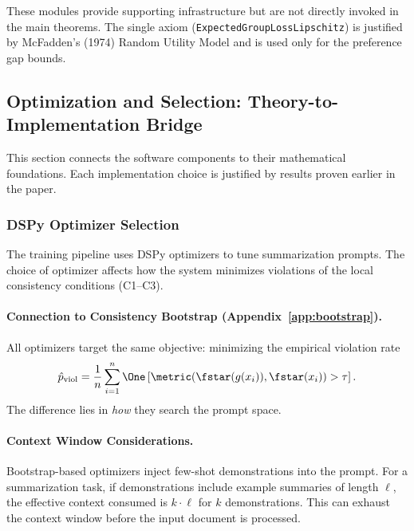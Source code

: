 These modules provide supporting infrastructure but are not directly invoked in the main theorems. The single axiom (\texttt{ExpectedGroupLossLipschitz}) is justified by McFadden's (1974) Random Utility Model and is used only for the preference gap bounds.



\subsection{Optimization and Selection: Theory-to-Implementation Bridge}\label{sec:theory-impl-bridge}

This section connects the software components to their mathematical foundations. Each implementation choice is justified by results proven earlier in the paper.

\subsubsection{DSPy Optimizer Selection}

The training pipeline uses DSPy optimizers to tune summarization prompts. The choice of optimizer affects how the system minimizes violations of the local consistency conditions (C1--C3).

\paragraph{Connection to Consistency Bootstrap (Appendix~\ref{app:bootstrap}).}
All optimizers target the same objective: minimizing the empirical violation rate
\[
\hat{p}_{\text{viol}} = \frac{1}{n} \sum_{i=1}^n \One\left[\metric(\fstar(g(x_i)), \fstar(x_i)) > \tau\right].
\]
The difference lies in \emph{how} they search the prompt space.

\paragraph{Context Window Considerations.}
Bootstrap-based optimizers inject few-shot demonstrations into the prompt. For a summarization task, if demonstrations include example summaries of length $\ell$, the effective context consumed is $k \cdot \ell$ for $k$ demonstrations. This can exhaust the context window before the input document is processed.

